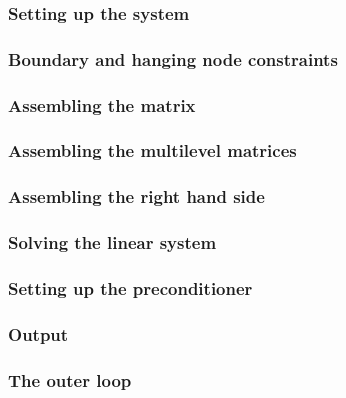 \begin{frame}
  \frametitle{Setting up the system}
  
\end{frame}

\begin{frame}
  \frametitle{Boundary and hanging node constraints}
  
\end{frame}

\begin{frame}[t]
  \frametitle{Assembling the matrix}
  
\end{frame}

\begin{frame}[t]
  \frametitle{Assembling the multilevel matrices}
  
\end{frame}

\begin{frame}[t]
  \frametitle{Assembling the right hand side}
  
\end{frame}

\begin{frame}[t]
  \frametitle{Solving the linear system}
  
\end{frame}

\begin{frame}[t]
  \frametitle{Setting up the preconditioner}
  
\end{frame}

\begin{frame}[t]
  \frametitle{Output}
  
\end{frame}

\begin{frame}[t]
  \frametitle{The outer loop}
  
\end{frame}

